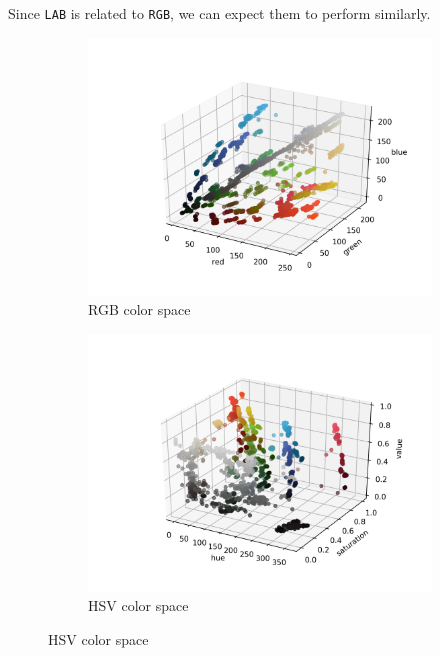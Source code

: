 \documentclass[12pt,a4paper]{article}
\begin{document}
	Since \texttt{LAB} is related to \texttt{RGB}, we can expect them to perform similarly.
	
	\begin{center}
		\begin{figure}[H]
			\begin{subfigure}{.5\linewidth}
				\includegraphics[width=\linewidth]{images/rgb.png}
				\caption{RGB color space}
			\end{subfigure}
			\begin{subfigure}{.5\linewidth}
				\includegraphics[width=\linewidth]{images/hsv.png}
				\caption{HSV color space}
			\end{subfigure}
		\end{figure}
	\end{center}
\end{document}
